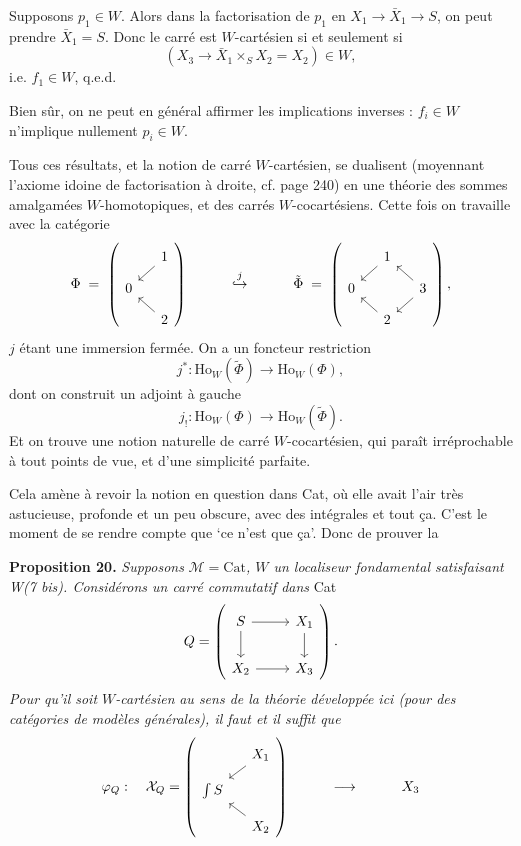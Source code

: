 \documentclass[11pt]{article}
\newcommand{\printedpage}[1]{\marginpar{\footnotesize p.~#1}}
\newcommand{\msp}[1]{\marginpar{\footnotesize [#1]}}
\newcommand{\Ho}{\mathrm{Ho}}
\begin{document}
\msp{page 261}
Supposons $p_1\in W$. Alors dans la factorisation de $p_1$ en $X_1\longrightarrow\bar{X}_1\longrightarrow S$, on peut prendre $\bar{X}_1=S$. Donc le carré est $W$-cartésien si et seulement si
\[
(X_3\longrightarrow\bar{X}_1\times_S X_2=X_2)\in W,
\]
i.e. $f_1\in W$, q.e.d.

Bien sûr, on ne peut en général affirmer les implications inverses : $f_i\in W$ n'implique nullement $p_i\in W$.

\printedpage{170}

Tous ces résultats, et la notion de carré $W$-cartésien, se dualisent (moyennant l'axiome idoine de factorisation à droite, cf. page 240) en une théorie des sommes amalgamées $W$-homotopiques, et des carrés $W$-cocartésiens. Cette fois on travaille avec la catégorie
\[
\Phi \;=\; \left(
\begin{tikzcd}[ampersand replacement=\&, row sep=small, column sep=small]
 \& 1 \arrow[dl] \\
0 \& \\
 \& 2 \arrow[ul]
\end{tikzcd}
\right)
\qquad\quad \overset{j}{\hookrightarrow} \qquad\quad
\tilde{\Phi} \;=\; \left(
\begin{tikzcd}[ampersand replacement=\&, row sep=small, column sep=small]
 \& 1 \arrow[dl] \& \\
0 \& \& 3 \arrow[ul] \arrow[dl] \\
 \& 2 \arrow[ul] \&
\end{tikzcd}
\right),
\]
$j$ étant une immersion fermée. On a un foncteur restriction
\[
j^* : \Ho_W(\tilde{\Phi}) \longrightarrow \Ho_W(\Phi),
\]
dont on construit un adjoint à gauche
\[
j_! : \Ho_W(\Phi) \longrightarrow \Ho_W(\tilde{\Phi}).
\]
Et on trouve une notion naturelle de
\msp{page 262}
carré $W$-cocartésien, qui paraît irréprochable à tout points de vue, et d'une simplicité parfaite. %

Cela amène à revoir la notion en question dans Cat, où elle avait l'air très astucieuse, profonde et un peu obscure, avec des intégrales et tout ça. C'est le moment de se rendre compte que `ce n'est que ça'. Donc de prouver la

\textbf{Proposition 20.} \textit{Supposons} $\mathcal{M} = \mathrm{Cat}$\textit{, $W$ un localiseur fondamental satisfaisant W(7 bis). Considérons un carré commutatif dans} Cat
\[
Q = \left(
\begin{tikzcd}[ampersand replacement=\&]
S \arrow[r] \arrow[d] \& X_1 \arrow[d] \\
X_2 \arrow[r] \& X_3
\end{tikzcd}
\right).
\]
\textit{Pour qu'il soit $W$-cartésien} \textit{au sens de la théorie développée ici (pour des catégories de modèles générales), il faut et il suffit que}
\[
\varphi_Q : \quad \mathcal{X}_Q = \left(
\begin{tikzcd}[ampersand replacement=\&, row sep=small, column sep=small]
 \& X_1 \arrow[dl] \\
\int S \& \\
 \& X_2 \arrow[ul]
\end{tikzcd}
\right) \qquad\quad \longrightarrow \qquad\quad X_3
\]
\end{document}
